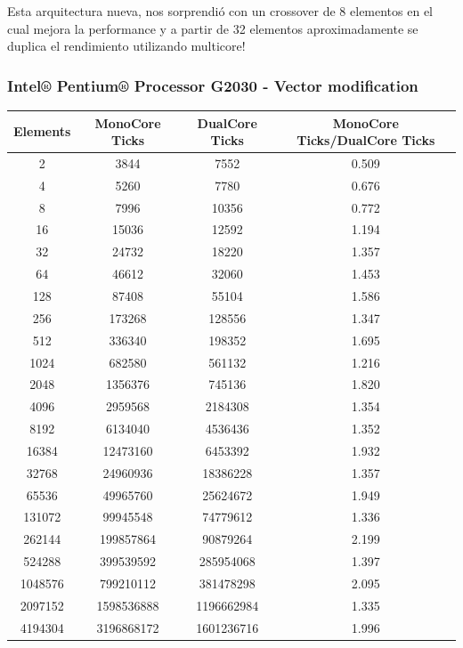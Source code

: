 	Esta arquitectura nueva, nos sorprendió con un crossover de 8 elementos en el cual mejora la performance y a partir de 32 elementos aproximadamente se duplica el rendimiento utilizando multicore!
\subsubsection{Intel® Pentium® Processor G2030 - Vector modification}

\begin{center}
	\begin{tabular}{|c|c|c|c|}
		\hline	
			Elements & MonoCore Ticks & DualCore Ticks & MonoCore Ticks/DualCore Ticks\\
		\hline
			2 & 3844 & 7552 & 0.509\\
		\hline
			4 & 5260 & 7780 & 0.676\\
		\hline
			8 & 7996 & 10356 & 0.772\\
		\hline
			16 & 15036 & 12592 & 1.194\\
		\hline
			32 & 24732 & 18220 & 1.357\\
		\hline
			64 & 46612 & 32060 & 1.453\\
		\hline
			128 & 87408 & 55104 & 1.586\\
		\hline
			256 & 173268 & 128556 & 1.347\\
		\hline
			512 & 336340 & 198352 & 1.695\\
		\hline
			1024 & 682580 & 561132 & 1.216\\
		\hline
			2048 & 1356376 & 745136 & 1.820\\
		\hline
			4096 & 2959568 & 2184308 & 1.354\\
		\hline
			8192 & 6134040 & 4536436 & 1.352\\
		\hline
			16384 & 12473160 & 6453392 & 1.932\\
		\hline
			32768 & 24960936 & 18386228 & 1.357\\
		\hline
			65536 & 49965760 & 25624672 & 1.949\\
		\hline
			131072 & 99945548 & 74779612 & 1.336\\
		\hline
			262144 & 199857864 & 90879264 & 2.199\\
		\hline
			524288 & 399539592 & 285954068 & 1.397\\
		\hline
			1048576 & 799210112 & 381478298 & 2.095\\
		\hline
			2097152 & 1598536888 & 1196662984 & 1.335\\
		\hline
			4194304 & 3196868172 & 1601236716 & 1.996\\
		\hline
	\end{tabular}
\end{center}
